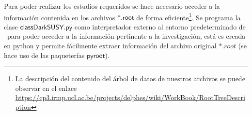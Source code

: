 

Para poder realizar los estudios requeridos se hace necesario acceder a la información contenida en los archivos $\textsf{*.root}$ de forma eficiente\footnote{La descripción del contenido del árbol de datos de nuestros archivos se puede observar en el enlace \href{https://cp3.irmp.ucl.ac.be/projects/delphes/wiki/WorkBook/RootTreeDescription}{https://\-cp3.\-irmp.\-ucl.\-ac.\-be/\-pro\-jects/\-delphes/\-wiki/\-Work\-Book/\-Root\-Tree\-Des\-crip\-tion}}. Se programa la clase $\textsf{classDarkSUSY.py}$ como interpretador externo al entorno predeterminado de \ROOT ~para poder acceder a la información pertinente a la investigación, está es creada en python y permite fácilmente extraer información del archivo original $*.root$ (se hace uso de las paqueterías $\textsf{pyroot}$). %

